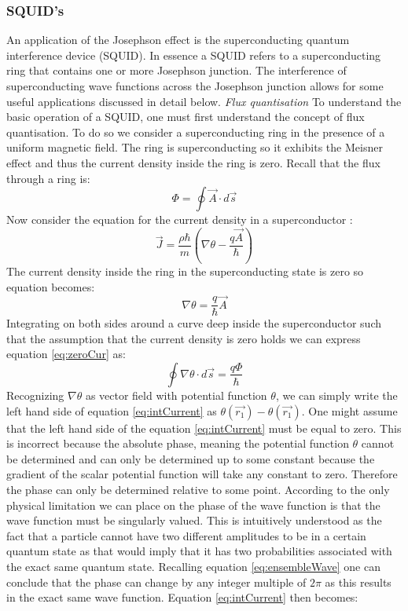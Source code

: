 \subsubsection{SQUID's}
An application of the Josephson effect is the superconducting quantum interference device (SQUID). In essence a SQUID refers to a superconducting ring that contains one or more Josephson junction. The interference of superconducting wave functions across the Josephson junction allows for some useful applications discussed in detail below. 
\newline
\textit{Flux quantisation}
\newline
To understand the basic operation of a SQUID, one must first understand the concept of flux quantisation. To do so we consider a superconducting ring in the presence of a uniform magnetic field. The ring is superconducting so it exhibits the Meisner effect and thus the current density inside the ring is zero. Recall that the flux through a ring is:
\begin{equation}
    \Phi = \oint \Vec{A} \cdot d\Vec{s}
\end{equation}
Now consider the equation for the current density in a superconductor \cite{Feynman_Leighton_Sands_2013}: 
\begin{equation}
    \Vec{J} = \frac{\rho\hbar}{m}(\nabla\theta - \frac{q\Vec{A}}{\hbar})
    \label{eq:current}
\end{equation}
The current density inside the ring in the superconducting state is zero so equation \label{eq:current} becomes:
\begin{equation}
    \nabla\theta = \frac{q}{\hbar}\Vec{A}
    \label{eq:zeroCur}
\end{equation}
Integrating on both sides around a curve deep inside the superconductor such that the assumption that the current density is zero holds we can express equation \ref{eq:zeroCur} as:
\begin{equation}
    \oint\nabla\theta\cdot d\Vec{s} = \frac{q\Phi}{\hbar}
    \label{eq:intCurrent}
\end{equation}
Recognizing $\nabla\theta$ as vector field with potential function $\theta$, we can simply write the left hand side of equation \ref{eq:intCurrent} as $\theta(\Vec{r_1}) - \theta(\Vec{r_1})$. One might assume that the left hand side of the equation \ref{eq:intCurrent} must be equal to zero. This is incorrect because the absolute phase, meaning the potential function $\theta$ cannot be determined and can only be determined up to some constant because the gradient of the scalar potential function will take any constant to zero. Therefore the phase can only be determined relative to some point. According to \cite{Feynman_Leighton_Sands_2013} the only physical limitation we can place on the phase of the wave function is that the wave function must be singularly valued. This is intuitively understood as the fact that a particle cannot have two different amplitudes to be in a certain quantum state as that would imply that it has two probabilities associated with the exact same quantum state. Recalling equation \ref{eq:ensembleWave} one can conclude that the phase can change by any integer multiple of $2\pi$ as this results in the exact same wave function. Equation \ref{eq:intCurrent} then becomes:
